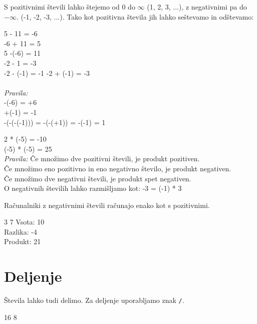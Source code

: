 \documentclass{book}
\begin{document}
S pozitivnimi števili lahko štejemo od 0 do $\infty$ (1, 2, 3, ...), z
negativnimi pa do $-\infty$. (-1, -2, -3, ...). Tako kot pozitivna števila jih
lahko seštevamo in odštevamo:

\begin{examples}
  5 - 11 = -6 \\
  -6 + 11 = 5 \\
  5 -(-6) = 11 \\
  -2 - 1 = -3 \\
  -2 - (-1) = -1
  -2 + (-1) = -3 \\\\
  \emph{Pravila:}\\
  -(-6) = +6\\
  +(-1) = -1 \\
  -(-(-(-1))) = -(-(+1)) = -(-1) = 1
\end{examples}

\begin{examples}
  2 * (-5) = -10 \\
  (-5) * (-5) = 25 \\

  \emph{Pravila:}
  Če množimo dve pozitivni števili, je produkt pozitiven. \\
  Če množimo eno pozitivno in eno negativno število, je produkt negativen. \\
  Če množimo dve negativni števili, je produkt spet negativen. \\
  O negativnih številih lahko razmišljamo kot: -3 = (-1) * 3
\end{examples}


\begin{examples}
Računalniki z negativnimi števili računajo enako kot s pozitivnimi.


\begin{inout}
3 7
\tcblower
Vsota: 10 \\
Razlika: -4 \\
Produkt: 21
\end{inout}

\end{examples}

\section{Deljenje}
Števila lahko tudi delimo. Za deljenje uporabljamo znak \verb+/+.

\begin{examples}


\begin{inout}
16 8
\end{inout}

\end{examples}
\end{document}
